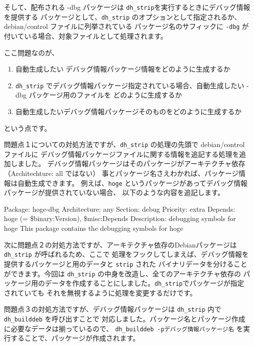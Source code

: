 \documentclass[mingoth,a4paper]{jsarticle}
\begin{document}
そして、配布される -dbg パッケージは \texttt{dh\_strip}を実行するときにデバッグ情報を提供する
パッケージとして、\texttt{dh\_strip} のオプションとして指定されるか、debian/control ファイルに列挙されている
パッケージ名のサフィックに \texttt{-dbg} が付いている場合、対象ファイルとして処理されます。

ここ問題なのが、
\begin{enumerate}
\item 自動生成したい デバッグ情報パッケージ情報をどのように生成するか
\item \texttt{dh\_strip} でデバッグ情報パッケージ指定されている場合、自動生成したい -dbg パッケージ用のファイルを
どのように生成するか
\item 自動生成したいデバッグ情報パッケージそのものをどのように生成するか
\end{enumerate}
という点です。

問題点１についての対処方法ですが、\texttt{dh\_strip} の処理の先頭で debian/control ファイルに
デバッグ情報パッケージファイルに関する情報を追記する処理を追加しました。
デバッグ情報パッケージはそのパッケージがアーキテクチャ依存（Architechture: all ではない）
事とパッケージ名さえわかれば、パッケージ情報は自動生成できます。
例えば、\texttt{hoge} というパッケージがあってデバッグ情報パッケージが提供されていない場合、
以下のような内容を追記します。

\begin{commandline}
Package: hoge-dbg
Architecture: any
Section: debug
Priority: extra
Depends: hoge (= \${binary:Version}), \${misc:Depends}
Description: debugging symbols for hoge
 This package contains the debugging symbols for hoge
\end{commandline}

次に問題点２の対処方法ですが、アーキテクチャ依存のDebianパッケージは \texttt{dh\_strip} が呼ばれるため、ここで
処理をフックしてしまえば、デバッグ情報を提供するパッケージと用のデータと \texttt{strip} された
バイナリデータを分けることができます。今回は \texttt{dh\_strip} の中身を改造し、全てのアーキテクチャ依存の
パッケージ用のデータを作成することにしました。\texttt{dh\_strip}でパッケージが指定されていても
それを無視するように処理を変更するだけです。

問題点３の対処方法ですが、デバッグ情報パッケージは \texttt{dh\_strip} 内で \texttt{dh\_builddeb} を呼び出すことで
対応しました。パッケージ名とパッケージ作成に必要なデータは揃っているので、
\texttt{dh\_builddeb -pデバッグ情報パッケージ名} を実行することで、パッケージが作成されます。
\end{document}
